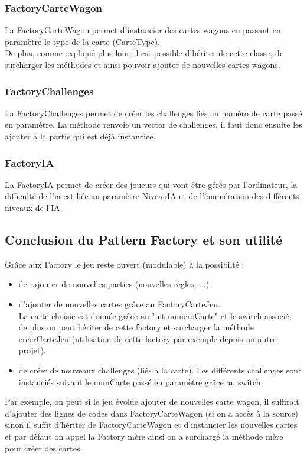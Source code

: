 \documentclass{report}
\begin{document}
\subsubsection{FactoryCarteWagon}
La FactoryCarteWagon permet d'instancier des cartes wagons en passant en paramètre le type de la carte (CarteType).\\
De plus, comme expliqué plus loin, il est possible d'hériter de cette classe, de surcharger les méthodes et ainsi pouvoir ajouter de nouvelles cartes wagons.
\subsubsection{FactoryChallenges}
La FactoryChallenges permet de créer les challenges liés au numéro de carte passé en paramètre. La méthode renvoie un vector de challenges, il faut donc ensuite les ajouter à la partie qui est déjà instanciée.
\subsubsection{FactoryIA}
La FactoryIA permet de créer des joueurs qui vont être gérés par l'ordinateur, la difficulté de l'ia est liée au paramètre NiveauIA et de l'énumération des différents niveaux de l'IA.

\subsection{Conclusion du Pattern Factory et son utilité}
Grâce aux Factory le jeu reste ouvert (modulable) à la possibilté :
\begin{itemize}
\item de rajouter de nouvelles parties (nouvelles règles, ...)
\item d'ajouter de nouvelles cartes grâce au FactoryCarteJeu.\\La carte choisie est donnée grâce au "int numeroCarte" et le switch associé, de plus on peut hériter de cette factory et surcharger la méthode creerCarteJeu (utilisation de cette factory par exemple depuis un autre projet).
\item de créer de nouveaux challenges (liés à la carte). Les différents challenges sont instanciés suivant le numCarte passé en paramètre grâce au switch.
\end{itemize}


Par exemple, on peut si le jeu évolue ajouter de nouvelles carte wagon, il suffirait d'ajouter des lignes de codes dans FactoryCarteWagon (si on a accès à la source) sinon il suffit d'hériter de FactoryCarteWagon et d'instancier les nouvelles cartes et par défaut on appel la Factory mère ainsi on a surchargé la méthode mère pour créer des cartes.
\end{document}
